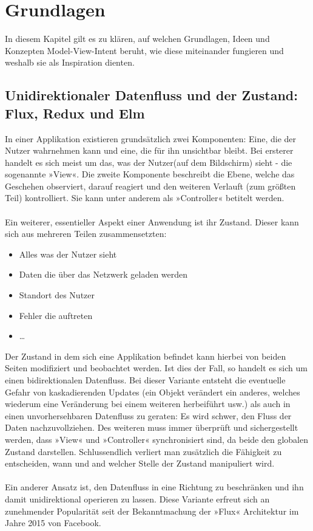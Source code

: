 \section{Grundlagen}
\label{sec:grundlagen}

In diesem Kapitel gilt es zu klären, auf welchen Grundlagen, Ideen und Konzepten Model-View-Intent beruht, wie diese miteinander fungieren und weshalb sie als Inspiration dienten.

\subsection{Unidirektionaler Datenfluss und der Zustand: Flux, Redux und Elm}

In einer Applikation existieren grundsätzlich zwei Komponenten: Eine, die der Nutzer wahrnehmen kann und eine, die für ihn unsichtbar bleibt. Bei ersterer handelt es sich meist um das, was der Nutzer(auf dem Bildschirm) sieht - die sogenannte »View«. Die zweite Komponente beschreibt die Ebene, welche das Geschehen observiert, darauf reagiert und den weiteren Verlauft (zum größten Teil) kontrolliert. Sie kann unter anderem als »Controller« betitelt werden.
\\
\\
Ein weiterer, essentieller Aspekt einer Anwendung ist ihr Zustand. Dieser kann sich aus mehreren Teilen zusammensetzten:
\begin{itemize}
	\item Alles was der Nutzer sieht
	\item Daten die über das Netzwerk geladen werden
	\item Standort des Nutzer
	\item Fehler die auftreten
	\item \dots
\end{itemize}
Der Zustand in dem sich eine Applikation befindet kann hierbei von beiden Seiten modifiziert und beobachtet werden. Ist dies der Fall, so handelt es sich um einen bidirektionalen Datenfluss. Bei dieser Variante entsteht die eventuelle Gefahr von kaskadierenden Updates (ein Objekt verändert ein anderes, welches wiederum eine Veränderung bei einem weiteren herbeiführt usw.) als auch in einen unvorhersehbaren Datenfluss zu geraten: Es wird schwer, den Fluss der Daten nachzuvollziehen. Des weiteren muss immer überprüft und sichergestellt werden, dass »View« und »Controller« synchronisiert sind, da beide den globalen Zustand darstellen. Schlussendlich verliert man zusätzlich die Fähigkeit zu entscheiden, wann und and welcher Stelle der Zustand manipuliert wird.
\\
\\
Ein anderer Ansatz ist, den Datenfluss in eine Richtung zu beschränken und ihn damit unidirektional
\cite{unidirectionalDataFlowFluxArchitectureIlyGelman2017, unidirectionalDataFlowTheCompleteReduxBookIlyGelman2017}
operieren zu lassen. Diese Variante erfreut sich an zunehmender Popularität seit der Bekanntmachung der »Flux«
\cite{fluxArchitectureAdamBoduch}
Architektur im Jahre 2015 von Facebook.
\cite{fluxAnnouncementYoutube}

